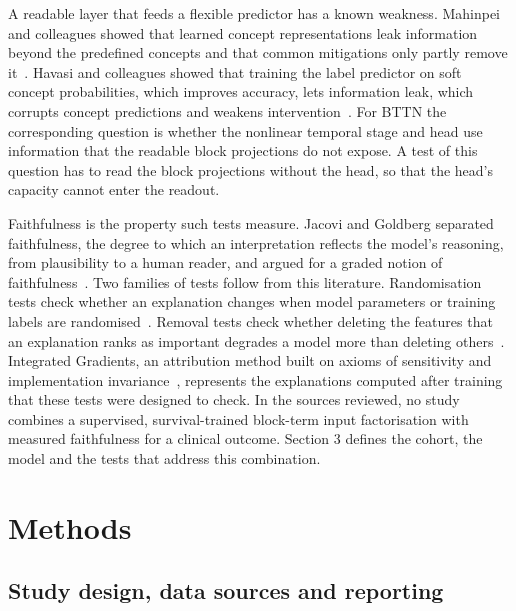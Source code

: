 \documentclass[preprint,12pt]{elsarticle}
\begin{document}
A readable layer that feeds a flexible predictor has a known weakness. Mahinpei and colleagues showed that learned concept representations leak information beyond the predefined concepts and that common mitigations only partly remove it~\cite{mahinpei2021}. Havasi and colleagues showed that training the label predictor on soft concept probabilities, which improves accuracy, lets information leak, which corrupts concept predictions and weakens intervention~\cite{havasi2022}. For BTTN the corresponding question is whether the nonlinear temporal stage and head use information that the readable block projections do not expose. A test of this question has to read the block projections without the head, so that the head's capacity cannot enter the readout.

Faithfulness is the property such tests measure. Jacovi and Goldberg separated faithfulness, the degree to which an interpretation reflects the model's reasoning, from plausibility to a human reader, and argued for a graded notion of faithfulness~\cite{jacovi2020}. Two families of tests follow from this literature. Randomisation tests check whether an explanation changes when model parameters or training labels are randomised~\cite{adebayo2018}. Removal tests check whether deleting the features that an explanation ranks as important degrades a model more than deleting others~\cite{hooker2019}. Integrated Gradients, an attribution method built on axioms of sensitivity and implementation invariance~\cite{sundararajan2017}, represents the explanations computed after training that these tests were designed to check. In the sources reviewed, no study combines a supervised, survival-trained block-term input factorisation with measured faithfulness for a clinical outcome. Section 3 defines the cohort, the model and the tests that address this combination.

\section{Methods}

\subsection{Study design, data sources and reporting}
\end{document}
